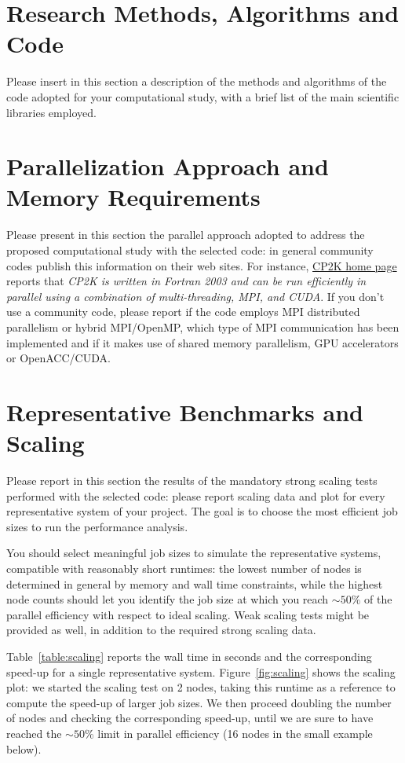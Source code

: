 \documentclass[11pt]{article}
\begin{document}
\section{Research Methods, Algorithms and Code}
Please insert in this section a description of the methods and algorithms of the code adopted for 
your computational study, with a brief list of the main scientific libraries employed. 

\section{Parallelization Approach and Memory Requirements}
Please present in this section the parallel approach adopted to address the proposed computational 
study with the selected code: in general community codes publish this information on their web sites.
For instance, \href{www.cp2k.org}{CP2K home page} reports that \emph{CP2K is written in Fortran 2003 
and can be run efficiently in parallel using a combination of multi-threading, MPI, and CUDA}.
If you don't use a community code, please report if the code employs MPI distributed parallelism or hybrid MPI/OpenMP, 
which type of MPI communication has been implemented and if it makes use of shared memory parallelism, 
GPU accelerators or OpenACC/CUDA.

\section{Representative Benchmarks and Scaling}
Please report in this section the results of the mandatory strong scaling tests performed with the 
selected code: please report scaling data and plot for every representative system of your project. 
The goal is to choose the most efficient job sizes to run the performance analysis. 

You should select meaningful job sizes to simulate the representative systems, compatible with 
reasonably short runtimes: the lowest number of nodes is determined in general by memory and wall time 
constraints, while the highest node counts should let you identify the job size at which you 
reach $\sim 50\%$ of the parallel efficiency with respect to ideal scaling. 
Weak scaling tests might be provided as well, in addition to the required strong scaling data. 

Table~\ref{table:scaling} reports the wall time in seconds and the corresponding speed-up for a single 
representative system. Figure~\ref{fig:scaling} shows the scaling plot: we started the scaling test on 
2 nodes, taking this runtime as a reference to compute the speed-up of larger job sizes. 
We then proceed doubling the number of nodes and checking the corresponding speed-up, until we are 
sure to have reached the $\sim 50\%$ limit in parallel efficiency (16 nodes in the small example below).
\end{document}
